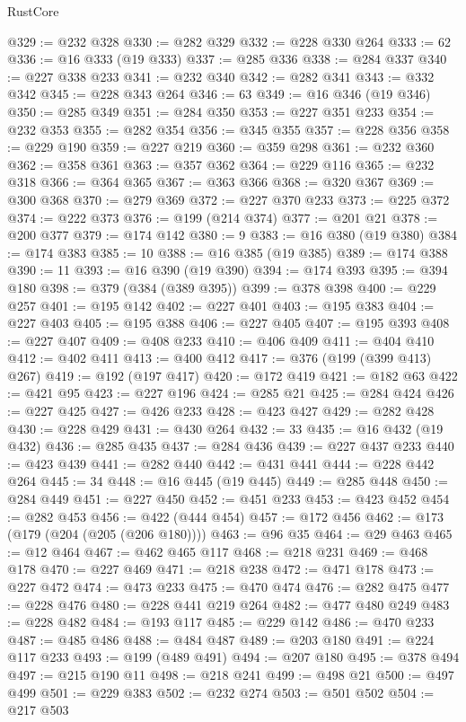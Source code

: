 \begin{lexlean}{RustCore}
\begin{coremodule}
@329 := @232 @328
@330 := @282 @329
@332 := @228 @330 @264
@333 := 62
@336 := @16 @333 (@19 @333)
@337 := @285 @336
@338 := @284 @337
@340 := @227 @338 @233
@341 := @232 @340
@342 := @282 @341
@343 := @332 @342
@345 := @228 @343 @264
@346 := 63
@349 := @16 @346 (@19 @346)
@350 := @285 @349
@351 := @284 @350
@353 := @227 @351 @233
@354 := @232 @353
@355 := @282 @354
@356 := @345 @355
@357 := @228 @356
@358 := @229 @190
@359 := @227 @219
@360 := @359 @298
@361 := @232 @360
@362 := @358 @361
@363 := @357 @362
@364 := @229 @116
@365 := @232 @318
@366 := @364 @365
@367 := @363 @366
@368 := @320 @367
@369 := @300 @368
@370 := @279 @369
@372 := @227 @370 @233
@373 := @225 @372
@374 := @222 @373
@376 := @199 (@214 @374)
@377 := @201 @21
@378 := @200 @377
@379 := @174 @142
@380 := 9
@383 := @16 @380 (@19 @380)
@384 := @174 @383
@385 := 10
@388 := @16 @385 (@19 @385)
@389 := @174 @388
@390 := 11
@393 := @16 @390 (@19 @390)
@394 := @174 @393
@395 := @394 @180
@398 := @379 (@384 (@389 @395))
@399 := @378 @398
@400 := @229 @257
@401 := @195 @142
@402 := @227 @401
@403 := @195 @383
@404 := @227 @403
@405 := @195 @388
@406 := @227 @405
@407 := @195 @393
@408 := @227 @407
@409 := @408 @233
@410 := @406 @409
@411 := @404 @410
@412 := @402 @411
@413 := @400 @412
@417 := @376 (@199 (@399 @413) @267)
@419 := @192 (@197 @417)
@420 := @172 @419
@421 := @182 @63
@422 := @421 @95
@423 := @227 @196
@424 := @285 @21
@425 := @284 @424
@426 := @227 @425
@427 := @426 @233
@428 := @423 @427
@429 := @282 @428
@430 := @228 @429
@431 := @430 @264
@432 := 33
@435 := @16 @432 (@19 @432)
@436 := @285 @435
@437 := @284 @436
@439 := @227 @437 @233
@440 := @423 @439
@441 := @282 @440
@442 := @431 @441
@444 := @228 @442 @264
@445 := 34
@448 := @16 @445 (@19 @445)
@449 := @285 @448
@450 := @284 @449
@451 := @227 @450
@452 := @451 @233
@453 := @423 @452
@454 := @282 @453
@456 := @422 (@444 @454)
@457 := @172 @456
@462 := @173 (@179 (@204 (@205 (@206 @180))))
@463 := @96 @35
@464 := @29 @463
@465 := @12 @464
@467 := @462 @465 @117
@468 := @218 @231
@469 := @468 @178
@470 := @227 @469
@471 := @218 @238
@472 := @471 @178
@473 := @227 @472
@474 := @473 @233
@475 := @470 @474
@476 := @282 @475
@477 := @228 @476
@480 := @228 @441 @219 @264
@482 := @477 @480 @249
@483 := @228 @482
@484 := @193 @117
@485 := @229 @142
@486 := @470 @233
@487 := @485 @486
@488 := @484 @487
@489 := @203 @180
@491 := @224 @117 @233
@493 := @199 (@489 @491)
@494 := @207 @180
@495 := @378 @494
@497 := @215 @190 @11
@498 := @218 @241
@499 := @498 @21
@500 := @497 @499
@501 := @229 @383
@502 := @232 @274
@503 := @501 @502
@504 := @217 @503

\end{coremodule}
\end{lexlean}
